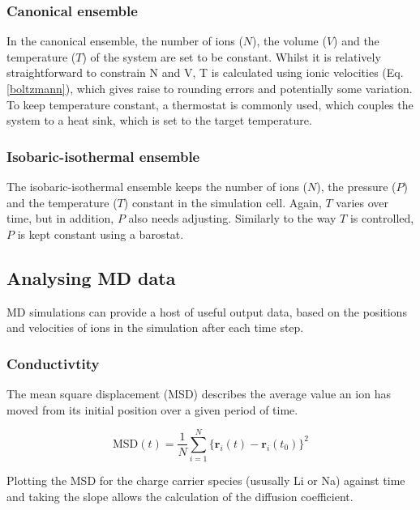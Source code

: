 \documentclass[12pt]{report}
\begin{document}
\subsubsection{Canonical ensemble}

In the canonical ensemble, the number of ions ($N$), the volume ($V$) and the temperature ($T$) of the system are set to be constant.
Whilst it is relatively straightforward to constrain N and V, T is calculated using ionic velocities (Eq. \ref{boltzmann}), which gives raise to rounding errors and potentially some variation.
To keep temperature constant, a thermostat is commonly used, which couples the system to a heat sink, which is set to the target temperature.

\subsubsection{Isobaric-isothermal ensemble}

The isobaric-isothermal ensemble keeps the number of ions ($N$), the pressure ($P$) and the temperature ($T$) constant in the simulation cell.
Again, $T$ varies over time, but in addition, $P$ also needs adjusting.
Similarly to the way $T$ is controlled, $P$ is kept constant using a barostat.

\subsection{Analysing MD data}

MD simulations can provide a host of useful output data, based on the positions and velocities of ions in the simulation after each time step.

\subsubsection{Conductivtity}

The mean square displacement (MSD) describes the average value an ion has moved from its initial position over a given period of time.

\begin{equation}
    \mathrm{MSD}(t) = \frac{1}{N} \sum_{i=1}^N \Big\{ \textbf{r}_i (t) - \textbf{r}_i(t_0) \Big\}^2
\end{equation}

\noindent
Plotting the MSD for the charge carrier species (ususally Li or Na) against time and taking the slope allows the calculation of the diffusion coefficient.
\end{document}
